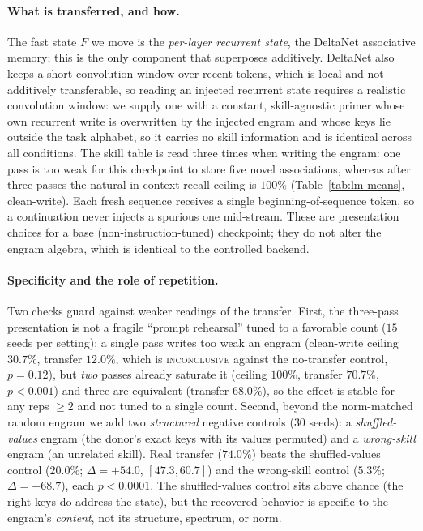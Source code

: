 \documentclass[11pt]{article}
\theoremstyle{definition}
\newcommand{\F}{F}
\begin{document}
\paragraph{What is transferred, and how.}
The fast state $\F$ we move is the \emph{per-layer recurrent state}, the DeltaNet associative memory; this is the only component that superposes additively. DeltaNet also keeps a short-convolution window over recent tokens, which is local and not additively transferable, so reading an injected recurrent state requires a realistic convolution window: we supply one with a constant, skill-agnostic primer whose own recurrent write is overwritten by the injected engram and whose keys lie outside the task alphabet, so it carries no skill information and is identical across all conditions. The skill table is read three times when writing the engram: one pass is too weak for this checkpoint to store five novel associations, whereas after three passes the natural in-context recall ceiling is $100\%$ (Table~\ref{tab:lm-means}, clean-write). Each fresh sequence receives a single beginning-of-sequence token, so a continuation never injects a spurious one mid-stream. These are presentation choices for a base (non-instruction-tuned) checkpoint; they do not alter the engram algebra, which is identical to the controlled backend.

\paragraph{Specificity and the role of repetition.}
Two checks guard against weaker readings of the transfer. First, the three-pass presentation is not a fragile ``prompt rehearsal'' tuned to a favorable count ($15$ seeds per setting): a single pass writes too weak an engram (clean-write ceiling $30.7\%$, transfer $12.0\%$, which is \textsc{inconclusive} against the no-transfer control, $p=0.12$), but \emph{two} passes already saturate it (ceiling $100\%$, transfer $70.7\%$, $p<0.001$) and three are equivalent (transfer $68.0\%$), so the effect is stable for any reps $\ge 2$ and not tuned to a single count. Second, beyond the norm-matched random engram we add two \emph{structured} negative controls ($30$ seeds): a \emph{shuffled-values} engram (the donor's exact keys with its values permuted) and a \emph{wrong-skill} engram (an unrelated skill). Real transfer ($74.0\%$) beats the shuffled-values control ($20.0\%$; $\Delta=+54.0$, $[47.3,60.7]$) and the wrong-skill control ($5.3\%$; $\Delta=+68.7$), each $p<0.0001$. The shuffled-values control sits above chance (the right keys do address the state), but the recovered behavior is specific to the engram's \emph{content}, not its structure, spectrum, or norm.
\end{document}
